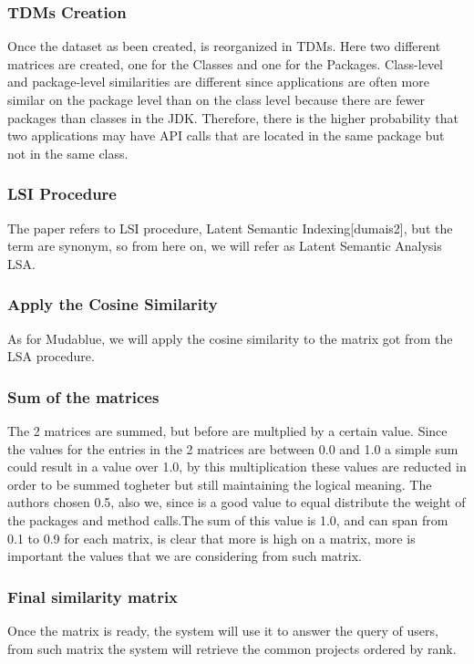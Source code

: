 \subsubsection{TDMs Creation}
Once the dataset as been created, is reorganized in TDMs. Here two different matrices are created, one for the Classes and one for the Packages. Class-level and package-level similarities are different since applications are often more similar on the package level than on the class level because there are fewer packages than classes in the JDK. Therefore, there is the higher probability that two applications may have API calls that are located in the same package but not in the same class.

\subsubsection{LSI Procedure}
The paper refers to LSI procedure, Latent Semantic Indexing[dumais2], but the term are synonym, so from here on, we will refer as Latent Semantic Analysis LSA.

\subsubsection{Apply the Cosine Similarity}
As for Mudablue, we will apply the cosine similarity to the matrix got from the LSA procedure.

\subsubsection{Sum of the matrices}
The 2 matrices are summed, but before are multplied by a certain value. Since the values for the entries in the 2 matrices are between 0.0 and 1.0 a simple sum could result in a value over 1.0, by this multiplication these values are reducted in order to be summed togheter but still maintaining the logical meaning. The authors chosen 0.5, also we, since is a good value to equal distribute the weight of the packages and method calls.The sum of this value is 1.0, and can span from 0.1 to 0.9 for each matrix, is clear that more is high on a matrix, more is important the values that we are considering from such matrix.

\subsubsection{Final similarity matrix}
Once the matrix is ready, the system will use it to answer the query of users, from such  matrix the system will retrieve the common projects ordered by rank.

